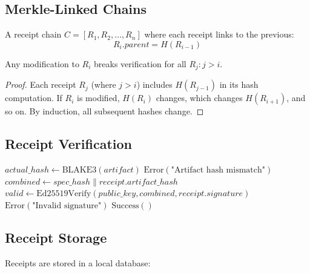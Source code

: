 \subsection{Merkle-Linked Chains}

\begin{definition}
    A receipt chain \(C = [R_1, R_2, \ldots, R_n]\) where each receipt links to the previous:
    \begin{equation}
        R_i.parent = H(R_{i-1})
    \end{equation}
\end{definition}

\begin{theorem}
    Any modification to \(R_i\) breaks verification for all \(R_j: j > i\).
\end{theorem}

\begin{proof}
    Each receipt \(R_j\) (where \(j > i\)) includes \(H(R_{j-1})\) in its hash computation. If \(R_i\) is modified, \(H(R_i)\) changes, which changes \(H(R_{i+1})\), and so on. By induction, all subsequent hashes change.
\end{proof}

\subsection{Receipt Verification}

\begin{algorithm}
\caption{Receipt Verification}
\begin{algorithmic}[1]
    \State $actual\_hash \gets \text{BLAKE3}(artifact)$
        \State \Return $\text{Error}(\text{"Artifact hash mismatch"})$
    \EndIf
    \State $combined \gets spec\_hash \| receipt.artifact\_hash$
    \State $valid \gets \text{Ed25519Verify}(public\_key, combined, receipt.signature)$
        \State \Return $\text{Error}(\text{"Invalid signature"})$
    \EndIf
    \State \Return $\text{Success}()$
\EndProcedure
\end{algorithmic}
\end{algorithm}

\subsection{Receipt Storage}

Receipts are stored in a local database:

